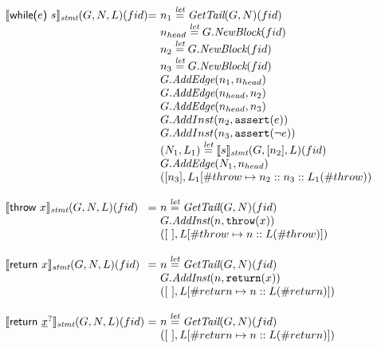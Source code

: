 \[
\begin{array}{l@{}l@{~}l}


\transfun{\ircfgwhile{e}{s}}_{\emph{stmt}}(G,N,L)(fid) & = &
	n_1 \letval \GetTail(G,N)(fid)\\
	& & n_{head} \letval G.\emph{NewBlock}(fid)\\
	& & n_2 \letval G.\emph{NewBlock}(fid)\\
	& & n_3 \letval G.\emph{NewBlock}(fid)\\
	& & G.\emph{AddEdge}(n_1,n_{head})\\
	& & G.\emph{AddEdge}(n_{head},n_2)\\
	& & G.\emph{AddEdge}(n_{head},n_3)\\
	& & G.AddInst(n_2, \TT{assert}(e))\\
	& & G.AddInst(n_3, \TT{assert}(\neg e))\\
	& & (N_1,L_1) \letval \transfun{s}_{\emph{stmt}}(G,[n_2],L)(fid)\\
	& & G.\emph{AddEdge}(N_1,n_{head})\\
	& & ([n_3],L_1[\#throw \mapsto n_2::n_3::L_1(\#throw)) \\
	& & \\
	
\transfun{\irthrow{x}}_{\emph{stmt}}(G,N,L)(fid) & = &
	n \letval \GetTail(G,N)(fid)\\
	& & G.\emph{AddInst}(n,\TT{throw}(x))\\
	& & ([\ ],L[\#throw \mapsto n::L(\#throw)])\\
	& & \\

\transfun{\ircfgreturn{x}}_{\emph{stmt}}(G,N,L)(fid) & = &
	n \letval \GetTail(G,N)(fid)\\
	& & G.\emph{AddInst}(n,\TT{return}(x))\\
	& & ([\ ],L[\#return \mapsto n::L(\#return)])\\
	& & \\
	
\transfun{\irreturn{}}_{\emph{stmt}}(G,N,L)(fid) & = &
	n \letval \GetTail(G,N)(fid)\\
	& & ([\ ],L[\#return \mapsto n::L(\#return)])\\
	& & \\
	

\end{array}\]
